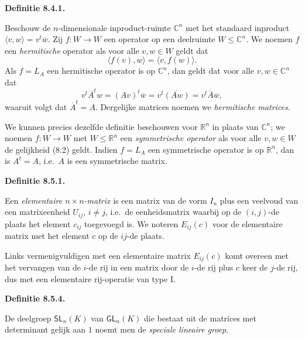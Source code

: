 \documentclass[10pt,a4paper]{article}
\newenvironment{res}[1]{%
  \par\noindent\textbf{Definitie #1.}~\ignorespaces
}{%
  \par\vspace{2pt}\normalfont
}
\begin{document}
\begin{res}{8.4.1}
\begin{myenum}
\item Beschouw de $n$-dimensionale inproduct-ruimte $\mathbb C^n$ met het standaard inproduct $\langle v,w\rangle=v^t\overline w$. Zij $f:W\to W$ een operator op een deelruimte $W\le\mathbb C^n$. We noemen $f$ een \textit{hermitische} operator als voor alle $v,w\in W$ geldt dat
\[
\langle f(v),w\rangle=\langle v,f(w)\rangle. \tag{8.2}
\]
Als $f=L_A$ een hermitische operator is op $\mathbb C^n$, dan geldt dat voor alle $v,w\in\mathbb C^n$ dat
\[
v^t\overline A^t w=(Av)^t\overline w=v^t\overline{(Aw)}=v^t\overline A\overline w,
\]
waaruit volgt dat $\overline A^t=A$. Dergelijke matrices noemen we \textit{hermitische matrices}.
\item We kunnen precies dezelfde definitie beschouwen voor $\mathbb R^n$ in plaats van $\mathbb C^n$; we noemen $f:W\to W$ met $W\le\mathbb R^n$ een \textit{symmetrische operator} als voor alle $v,w\in W$ de gelijkheid (8.2) geldt. Indien $f=L_A$ een symmetrische operator is op $\mathbb R^n$, dan is $A^t=A$, i.e.\ $A$ is een symmetrische matrix.
\end{myenum}
\end{res}

\begin{res}{8.5.1}
Een \textit{elementaire $n\times n$-matrix} is een matrix van de vorm $I_n$ plus een veelvoud van een matrixeenheid $U_{ij}$, $i\ne j$, i.e.\ de eenheidsmatrix waarbij op de $(i,j)$-de plaats het element $c_{ij}$ toegevoegd is. We noteren $E_{ij}(c)$ voor de elementaire matrix met het element $c$ op de $ij$-de plaats.

Links vermenigvuldigen met een elementaire matrix $E_{ij}(c)$ komt overeen met het vervangen van de $i$-de rij in een matrix door de $i$-de rij plus $c$ keer de $j$-de rij, dus met een elementaire rij-operatie van type I.
\end{res}

\begin{res}{8.5.4}
De deelgroep $\mathsf{SL}_n(K)$ van $\mathsf{GL}_n(K)$ die bestaat uit de matrices met determinant gelijk aan $1$ noemt men de \textit{speciale lineaire groep}.
\end{res}
\end{document}

